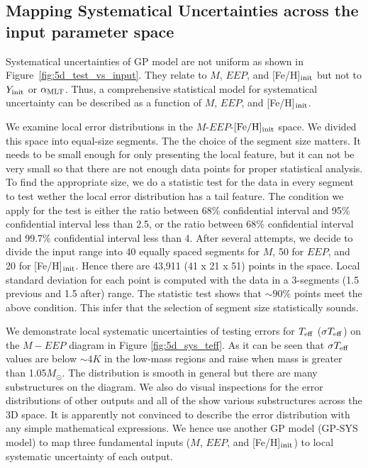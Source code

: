 \subsection{Mapping Systematical Uncertainties across the input parameter space}\label{sec:sys}

Systematical uncertainties of GP model are not uniform as shown in Figure~\ref{fig:5d_test_vs_input}. They relate to $M$, $EEP$, and [Fe/H]$_{\rm init}$ but not to $Y_{\rm init}$ or $\alpha_{\rm MLT}$.  Thus, a comprehensive statistical model for systematical uncertainty can be described as a function of $M$, $EEP$, and [Fe/H]$_{\rm init}$. 
%

We examine local error distributions in the $M$-$EEP$-$\rm [Fe/H]_{init}$ space. We divided this space into equal-size segments. The the choice of the segment size matters. It needs to be small enough for only presenting the local feature, but it can not be very small so that there are not enough data points for proper statistical analysis. 
%
To find the appropriate size, we do a statistic test for the data in every segment to test wether the local error distribution has a tail feature. The condition we apply for the test is either the ratio between 68\% confidential interval and 95\% confidential interval less than 2.5, or the ratio between 68\%  confidential interval and 99.7\% confidential interval less than 4. 
%
After several attempts, we decide to divide the input range into 40 equally spaced segments for $M$, 50 for $EEP$, and 20 for [Fe/H]$_{\rm init}$. Hence there are 43,911 (41 x 21 x 51) points in the space. Local standard deviation for each point is computed with the data in a 3-segments (1.5 previous and 1.5 after) range.  The statistic test shows that $\sim 90\%$ points meet the above condition. This infer that the selection of segment size statistically sounds.  

%
We demonstrate local systematic uncertainties of testing errors for $T_{\rm eff}$ ($\sigma T_{\rm eff}$) on the $M-EEP$ diagram in Figure \ref{fig:5d_sys_teff}. As it can be seen that $\sigma T_{\rm eff}$ values are below $\sim 4 K$ in the low-mass regions and raise when mass is greater than 1.05$M_{\odot}$. The distribution is smooth in general but there are many substructures on the diagram. We also do visual inspections for the error distributions of other outputs and all of the show various substructures across the 3D space. It is apparently not convinced to describe the error distribution with any simple mathematical expressions. We hence use another GP model (GP-SYS model) to map three fundamental inputs ($M$, $EEP$, and [Fe/H]$_{\rm init}$) to local systematic uncertainty of each output.   

